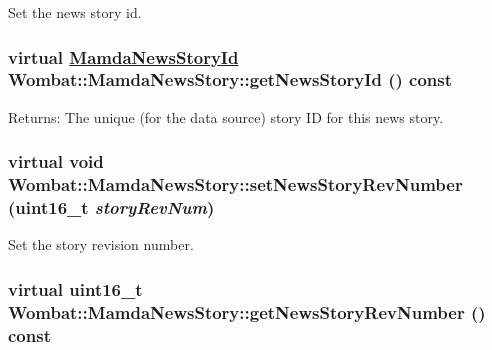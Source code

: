 Set the news story id. 

\hypertarget{classWombat_1_1MamdaNewsStory_e997764d03f29d1465a395497d68811b}{
\subsubsection[getNewsStoryId]{\setlength{\rightskip}{0pt plus 5cm}virtual \hyperlink{namespaceWombat_f7b94f4bb44eb78420c0d3ba0413424e}{Mamda\-News\-Story\-Id} Wombat::Mamda\-News\-Story::get\-News\-Story\-Id () const}}
\label{classWombat_1_1MamdaNewsStory_e997764d03f29d1465a395497d68811b}


\begin{Desc}
\item[Returns:]The unique (for the data source) story ID for this news story. \end{Desc}
\hypertarget{classWombat_1_1MamdaNewsStory_2e6e16aff657f33fbbb789a72eaa553e}{
\subsubsection[setNewsStoryRevNumber]{\setlength{\rightskip}{0pt plus 5cm}virtual void Wombat::Mamda\-News\-Story::set\-News\-Story\-Rev\-Number (uint16\_\-t {\em story\-Rev\-Num})}}
\label{classWombat_1_1MamdaNewsStory_2e6e16aff657f33fbbb789a72eaa553e}


Set the story revision number. 

\hypertarget{classWombat_1_1MamdaNewsStory_8d9ab8e6dad0a9d90d2ea6bb719ab28c}{
\subsubsection[getNewsStoryRevNumber]{\setlength{\rightskip}{0pt plus 5cm}virtual uint16\_\-t Wombat::Mamda\-News\-Story::get\-News\-Story\-Rev\-Number () const}}
\label{classWombat_1_1MamdaNewsStory_8d9ab8e6dad0a9d90d2ea6bb719ab28c}


